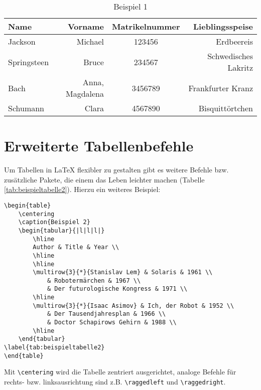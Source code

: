 \begin{table}[b]
	
	\caption{Beispiel 1}
	\begin{tabular}{l|r|c|r}
		\toprule
		\textbf{Name} & \textbf{Vorname} & \textbf{Matrikelnummer} & \textbf{Lieblingsspeise}\\
		\midrule
		Jackson & Michael & 123456 & Erdbeereis \\
		Springsteen & Bruce & 234567 & Schwedisches Lakritz \\
		Bach & Anna, Magdalena & 3456789 & Frankfurter Kranz \\
		Schumann & Clara & 4567890 & Bisquittörtchen \\
		\bottomrule
	\end{tabular}
	\label{tab:beispieltabelle1}
\end{table}

\section{Erweiterte Tabellenbefehle}
Um Tabellen in LaTeX flexibler zu gestalten gibt es weitere Befehle bzw. zusätzliche Pakete, die einem das Leben leichter machen (Tabelle \ref{tab:beispieltabelle2}). Hierzu ein weiteres Beispiel:

\begin{lstlisting}[caption={Tabelle \ref{tab:beispieltabelle2}}]
\begin{table}
	\centering
	\caption{Beispiel 2}
	\begin{tabular}{|l|l|l|}
		\hline
		Author & Title & Year \\
		\hline
		\hline
		\multirow{3}{*}{Stanislav Lem} & Solaris & 1961 \\
 			& Robotermärchen & 1967 \\
 			& Der futurologische Kongress & 1971 \\
		\hline
		\multirow{3}{*}{Isaac Asimov} & Ich, der Robot & 1952 \\
 			& Der Tausendjahresplan & 1966 \\
 			& Doctor Schapirows Gehirn & 1988 \\
		\hline
	\end{tabular}
\label{tab:beispieltabelle2}
\end{table}
\end{lstlisting}

Mit \lstinline|\centering| wird die Tabelle zentriert ausgerichtet, analoge Befehle für rechts- bzw. linksausrichtung sind z.B. \lstinline|\raggedleft| und \lstinline|\raggedright|. \\


